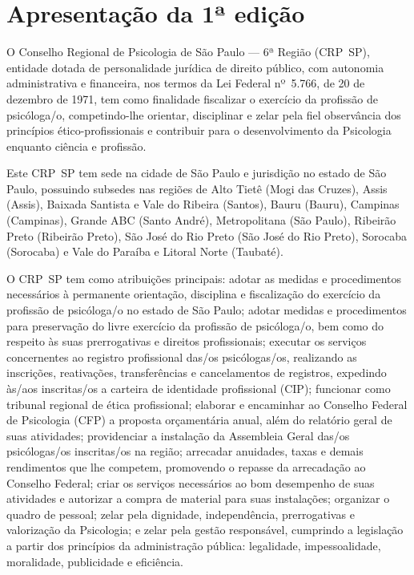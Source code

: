 \chapter{Apresentação da 1ª edição}

O Conselho Regional de Psicologia de São Paulo --- 6ª Região (CRP~SP),
entidade dotada de personalidade jurídica de direito público, com
autonomia administrativa e financeira, nos termos da Lei Federal
nº~5.766, de 20 de dezembro de 1971, tem como finalidade fiscalizar o
exercício da profissão de psicóloga/o, competindo-lhe orientar,
disciplinar e zelar pela fiel observância dos princípios
ético-profissionais e contribuir para o desenvolvimento da Psicologia
enquanto ciência e profissão.

Este CRP~SP tem sede na cidade de São Paulo e jurisdição no estado de
São Paulo, possuindo subsedes nas regiões de Alto Tietê (Mogi das
Cruzes), Assis (Assis), Baixada Santista e Vale do Ribeira (Santos),
Bauru (Bauru), Campinas (Campinas), Grande ABC (Santo André),
Metropolitana (São Paulo), Ribeirão Preto (Ribeirão Preto), São José do
Rio Preto (São José do Rio Preto), Sorocaba (Sorocaba) e Vale do Paraíba
e Litoral Norte (Taubaté).

O CRP~SP tem como atribuições principais: adotar as medidas e
procedimentos necessários à permanente orientação, disciplina e
fiscalização do exercício da profissão de psicóloga/o no estado de São
Paulo; adotar medidas e procedimentos para preservação do livre
exercício da profissão de psicóloga/o, bem como do respeito às suas
prerrogativas e direitos profissionais; executar os serviços
concernentes ao registro profissional das/os psicólogas/os, realizando
as inscrições, reativações, transferências e cancelamentos de registros,
expedindo às/aos inscritas/os a carteira de identidade profissional
(CIP); funcionar como tribunal regional de ética profissional; elaborar
e encaminhar ao Conselho Federal de Psicologia (CFP) a proposta
orçamentária anual, além do relatório geral de suas atividades;
providenciar a instalação da Assembleia Geral das/os psicólogas/os
inscritas/os na região; arrecadar anuidades, taxas e demais rendimentos
que lhe competem, promovendo o repasse da arrecadação ao Conselho
Federal; criar os serviços necessários ao bom desempenho de suas
atividades e autorizar a compra de material para suas instalações;
organizar o quadro de pessoal; zelar pela dignidade, independência,
prerrogativas e valorização da Psicologia; e zelar pela gestão
responsável, cumprindo a legislação a partir dos princípios da
administração pública: legalidade, impessoalidade, moralidade,
publicidade e eficiência.

